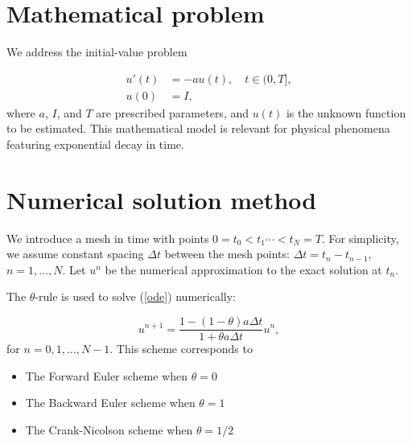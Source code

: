 \documentclass[twoside]{book}
\begin{document}
\section{Mathematical problem}

\label{math:problem}

 

We address the initial-value problem

\begin{align}
u'(t) &= -au(t), \quad t \in (0,T], \label{ode}\\
u(0)  &= I,                         \label{initial:value}
\end{align}
where $a$, $I$, and $T$ are prescribed parameters, and $u(t)$ is
the unknown function to be estimated. This mathematical model
is relevant for physical phenomena featuring exponential decay
in time.



\section{Numerical solution method}

\label{numerical:problem}

  

We introduce a mesh in time with points $0= t_0< t_1 \cdots < t_N=T$.
For simplicity, we assume constant spacing $\Delta t$ between the
mesh points: $\Delta t = t_{n}-t_{n-1}$, $n=1,\ldots,N$. Let
$u^n$ be the numerical approximation to the exact solution at $t_n$.

The $\theta$-rule is used to solve (\ref{ode}) numerically:

\[
u^{n+1} = \frac{1 - (1-\theta) a\Delta t}{1 + \theta a\Delta t}u^n,
\]
for $n=0,1,\ldots,N-1$. This scheme corresponds to

\begin{itemize}
  \item The Forward Euler scheme when $\theta=0$

  \item The Backward Euler scheme when $\theta=1$

  \item The Crank-Nicolson scheme when $\theta=1/2$
\end{itemize}
\end{document}
